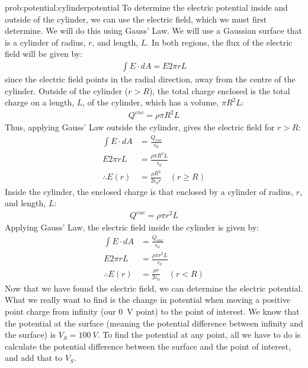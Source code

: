\begin{solution}{prob:potential:cylinderpotential}\label{soln:potential:cylinderpotential}
To determine the electric potential inside and outside of the cylinder, we can use the electric field, which we must first determine. We will do this using Gauss' Law. We will use a Gaussian surface that is a cylinder of radius, $r$, and length, $L$. In both regions, the flux of the electric field will be given by:
\begin{align*}
\int E\cdot dA  = E 2\pi rL
\end{align*}
since the electric field points in the radial direction, away from the centre of the cylinder. Outside of the cylinder ($r>R$), the total charge enclosed is the total charge on a length, $L$, of the cylinder, which has a volume, $\pi R^2 L$:
\begin{align*}
Q^{enc}=\rho \pi R^2 L
\end{align*} 
Thus, applying Gauss' Law outside the cylinder, gives the electric field for $r>R$:
\begin{align*}
\int E\cdot dA &= \frac{Q_{enc}}{\epsilon_0}\\
E 2\pi rL &= \frac{\rho \pi R^2 L}{\epsilon_0}\\
\therefore E(r) &= \frac{\rho R^2}{2\epsilon_0r}\quad(r\geq R)
\end{align*}
Inside the cylinder, the enclosed charge is that enclosed by a cylinder of radius, $r$, and length, $L$:
\begin{align*}
Q^{enc}=\rho \pi r^2 L
\end{align*}
Applying Gauss' Law, the electric field inside the cylinder is given by:
\begin{align*}
\int E\cdot dA &= \frac{Q_{enc}}{\epsilon_0}\\
E 2\pi rL &= \frac{\rho \pi r^2 L}{\epsilon_0}\\
\therefore E(r) &= \frac{\rho r}{2\epsilon_0}\quad(r<R)
\end{align*}
Now that we have found the electric field, we can determine the electric potential. What we really want to find is the change in potential when moving a positive point charge from infinity (our \SI{0}{V} point) to the point of interest. We know that the potential at the surface (meaning the potential difference between infinity and the surface) is $V_S=\SI{100}{V}$. To find the potential at any point, all we have to do is calculate the potential difference between the surface and the point of interest, and add that to $V_S$.


\end{solution}
